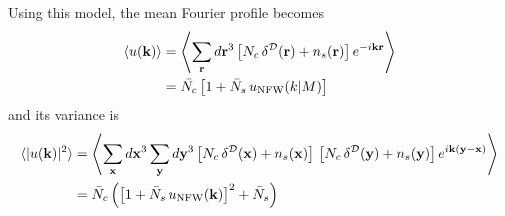 \documentclass{article}
\begin{document}
Using this model, the mean Fourier profile becomes
\begin{align}
 \langle u({\bf k})\rangle
 &=\left\langle \sum_{\bf r} d{\bf r}^3 \left[N_c\,\delta^{\cal D}({\bf r})+n_s({\bf r})\right]e^{-i{\bf k}{\bf r}}\right\rangle\\
 &=\bar{N_c}\left[1+\bar{N}_s\,u_{\rm NFW}(k|M)\right]\\
\end{align}
and its variance is
\begin{align}
\langle |u({\bf k})|^2\rangle
 &=\left\langle \sum_{\bf x} d{\bf x}^3\sum_{\bf y} d{\bf y}^3 \left[N_c\,\delta^{\cal D}({\bf x})+n_s({\bf x})\right]\,\left[N_c\,\delta^{\cal D}({\bf y})+n_s({\bf y})\right]e^{i{\bf k}({\bf y}-{\bf x})}\right\rangle\\ 
 &=\bar{N}_c\left(\left[1+\bar{N}_s\,u_{\rm NFW}({\bf k})\right]^2+\bar{N}_s\right)
\end{align}






\end{document}
